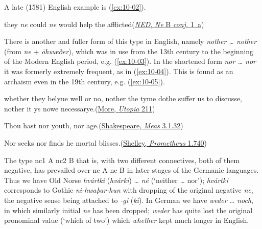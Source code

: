 A late (1581) English example is (\ref{ex:10-02}).

\ea \label{ex:10-02}
they \emph{ne} could \emph{ne} would help the afflicted\hfill(\href{https://archive.org/details/oed6barch/page/n885/mode/2up?view=theater}{\textit{NED}, \textit{Ne} B \textit{conj.} 1~a})
\z

There is another and fuller form of this type in English, namely \textit{nother {\dots} nother} (from \textit{ne} + \textit{ōhwæðer}), which was in use from the 13th century to the beginning of the Modern English period, e.g. (\ref{ex:10-03}). In the shortened form \textit{nor {\dots} nor} it was formerly extremely frequent, as in (\ref{ex:10-04}). This is found as an archaism even in the 19th century, e.g. (\ref{ex:10-05}).

\ea \label{ex:10-03}
whether they belyue well or no, nother the tyme dothe suffer us to discusse, nother it ys nowe necessarye.\hfill(\href{https://archive.org/details/utopiasirthomas00robigoog/page/n321/mode/2up?q=%22nother+the+tyme%22&view=theater}{More, \textit{Utopia} 211})
\z

\ea \label{ex:10-04}
Thou hast nor youth, nor age.\hfill(\href{https://internetshakespeare.uvic.ca/doc/MM_F1/scene/3.1/index.html#tln-1235}{Shakespeare, \textit{Meas} 3.1.32})
\z

\ea \label{ex:10-05}
Nor seeks nor finds he mortal blisses.\hfill(\href{https://archive.org/details/completepoeticalshel/page/220/mode/2up?view=theater&q=%22nor+seeks+nor+finds+he%22}{Shelley, \textit{Prometheus} 1.740})
\z
{}

 \label{sec:type2}
The type nc1 A nc2 B that is, with two different connectives, both of them negative, has prevailed over nc A nc B in later stages of the Germanic languages. Thus we have Old Norse \textit{hvártki} (\textit{hvárki}) {\dots} \textit{né} (`neither {\dots} nor'); \textit{hvártki} corresponds to Gothic \textit{ni-hwaþar-hun} with dropping of the original negative \textit{ne}, the negative sense being attached to \textit{-gi} (\textit{ki}). In German we have 
\textit{weder {\dots} noch}, in which similarly initial \textit{ne} has been dropped; \textit{weder} has quite lost the original pronominal value (`which of two') which \textit{whether} kept much longer in English.

